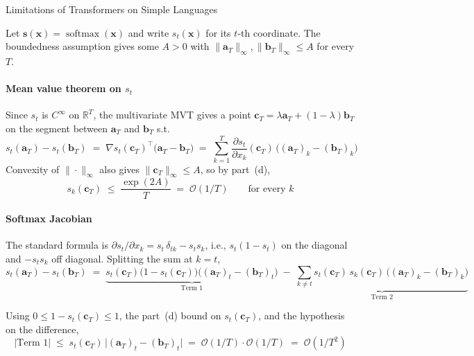 \begin{question}{Limitations of Transformers on Simple Languages}
\begin{subquestion}
    Let $\mathbf{s}(\mathbf{x}) = \operatorname{softmax}(\mathbf{x})$ and write $s_t(\mathbf{x})$ for its $t$-th coordinate. 
    The boundedness assumption gives some $A > 0$ with $\|\mathbf{a}_T\|_{\infty}, \|\mathbf{b}_T\|_{\infty} \le A$ for every $T$.

    \paragraph{Mean value theorem on $s_t$}
    Since $s_t$ is $C^{\infty}$ on $\mathbb{R}^{T}$, the multivariate MVT gives a point $\mathbf{c}_T = \lambda \mathbf{a}_T + (1-\lambda)\mathbf{b}_T$ on the segment between $\mathbf{a}_T$ and $\mathbf{b}_T$ s.t.
    \begin{equation*}
        s_t(\mathbf{a}_T) - s_t(\mathbf{b}_T) \;=\; \nabla s_t(\mathbf{c}_T)^{\!\top}\bigl(\mathbf{a}_T - \mathbf{b}_T\bigr) \;=\; \sum_{k=1}^{T} \frac{\partial s_t}{\partial x_k}(\mathbf{c}_T)\,\bigl((\mathbf{a}_T)_k - (\mathbf{b}_T)_k\bigr)
    \end{equation*}
    Convexity of $\|\cdot\|_{\infty}$ also gives $\|\mathbf{c}_T\|_{\infty} \le A$, so by part~(d),
    \begin{equation*}
        s_k(\mathbf{c}_T) \;\le\; \frac{\exp(2A)}{T} \;=\; \mathcal{O}(1/T) \qquad \text{for every } k
    \end{equation*}

    \paragraph{Softmax Jacobian}
    The standard formula is $\partial s_t / \partial x_k = s_t\,\delta_{tk} - s_t s_k$, i.e., $s_t(1-s_t)$ on the diagonal and $-s_t s_k$ off diagonal. 
    Splitting the sum at $k = t$,
    \begin{equation*}
        s_t(\mathbf{a}_T) - s_t(\mathbf{b}_T)
        \;=\; \underbrace{s_t(\mathbf{c}_T)\bigl(1 - s_t(\mathbf{c}_T)\bigr)\bigl((\mathbf{a}_T)_t - (\mathbf{b}_T)_t\bigr)}_{\text{Term 1}}
        \;-\; \underbrace{\sum_{k \ne t} s_t(\mathbf{c}_T)\, s_k(\mathbf{c}_T)\,\bigl((\mathbf{a}_T)_k - (\mathbf{b}_T)_k\bigr)}_{\text{Term 2}}
    \end{equation*}

    Using $0 \le 1 - s_t(\mathbf{c}_T) \le 1$, the part~(d) bound on $s_t(\mathbf{c}_T)$, and the hypothesis on the difference,
    \begin{equation*}
        |\text{Term 1}| \;\le\; s_t(\mathbf{c}_T)\,\bigl|(\mathbf{a}_T)_t - (\mathbf{b}_T)_t\bigr|
        \;=\; \mathcal{O}(1/T) \cdot \mathcal{O}(1/T) \;=\; \mathcal{O}(1/T^{2})
    \end{equation*}


\end{subquestion}
\end{question}
